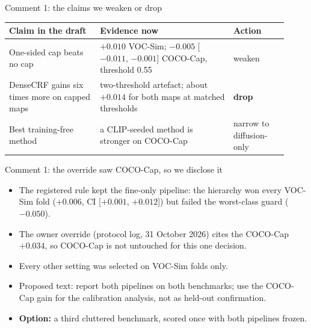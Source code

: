\begin{frame}{Comment 1: the claims we weaken or drop}
\begin{slidetable}
\begin{tabular}{@{}>{\raggedright\arraybackslash}p{0.30\linewidth}>{\raggedright\arraybackslash}p{0.44\linewidth}>{\raggedright\arraybackslash}p{0.18\linewidth}@{}}
\toprule
Claim in the draft & Evidence now & Action \\
\midrule
One-sided cap beats no cap & $+0.010$ VOC-Sim; $-0.005$ [$-0.011$, $-0.001$] COCO-Cap, threshold 0.55 & weaken \\
DenseCRF gains six times more on capped maps & two-threshold artefact; about $+0.014$ for both maps at matched thresholds & \textbf{drop} \\
Best training-free method & a CLIP-seeded method is stronger on COCO-Cap & narrow to diffusion-only \\
\bottomrule
\end{tabular}
\end{slidetable}
\end{frame}

\begin{frame}{Comment 1: the override saw COCO-Cap, so we disclose it}
\begin{itemize}
\item The registered rule kept the fine-only pipeline: the hierarchy won every VOC-Sim fold ($+0.006$, CI [$+0.001$, $+0.012$]) but failed the worst-class guard ($-0.050$).
\item The owner override (protocol log, 31 October 2026) cites the COCO-Cap $+0.034$, so COCO-Cap is not untouched for this one decision.
\item Every other setting was selected on VOC-Sim folds only.
\item Proposed text: report both pipelines on both benchmarks; use the COCO-Cap gain for the calibration analysis, not as held-out confirmation.
\item \textbf{Option:} a third cluttered benchmark, scored once with both pipelines frozen.
\end{itemize}
\end{frame}

